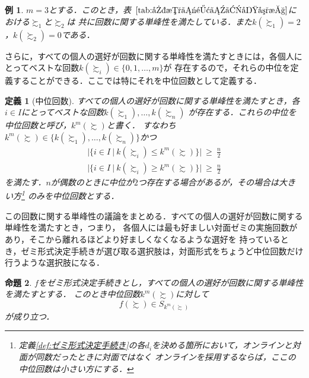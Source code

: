 \documentclass[dvipdfmx]{jsarticle}
\newtheorem{definition}{定義}
\newtheorem{proposition}[definition]{命題}
\newtheorem{example}{例}
\begin{document}
\begin{example}
  $m=3$とする．このとき，表~$\ref{tab:回数に関する単峰性}$における$\succsim_1$と$\succsim_2$は
  共に回数に関する単峰性を満たしている．また$k(\succsim_1) = 2$，$k(\succsim_2) = 0$である．
\end{example}

さらに，すべての個人の選好が回数に関する単峰性を満たすときには，各個人にとってベストな回数$k(\succsim_i) \in \{0,1,\ldots,m\}$が
存在するので，それらの中位を定義することができる．ここでは特にそれを中位回数として定義する．

\begin{definition}[中位回数]\label{def:中位回数}
  すべての個人の選好が回数に関する単峰性を満たすとき，各$i \in I$にとってベストな回数$k(\succsim_1),\ldots,k(\succsim_n)$
  が存在する．これらの中位を中位回数と呼び，$k^m(\succsim)$と書く．
  すなわち$k^m(\succsim) \in \{k(\succsim_1), \ldots, k(\succsim_n) \}$かつ
  \begin{gather*}
    |\{i \in I \ | \ k(\succsim_i) \leq k^m(\succsim) \}| \ \geq \ \frac{n}{2} \\
    |\{i \in I \ | \ k(\succsim_i) \geq k^m(\succsim) \}| \ \geq \ \frac{n}{2}
  \end{gather*}
  を満たす．$n$が偶数のときに中位が$2$つ存在する場合があるが，その場合は大きい方\footnote{
    定義\ref{def:ゼミ形式決定手続き}の各$d_i$を決める箇所において，オンラインと対面が同数だったときに対面ではなく
    オンラインを採用するならば，ここの中位回数は小さい方にする．
  }
  のみを中位回数とする．
\end{definition}

この回数に関する単峰性の議論をまとめる．すべての個人の選好が回数に関する単峰性を満たすとき，つまり，
各個人には最も好ましい対面ゼミの実施回数があり，そこから離れるほどより好ましくなくなるような選好を
持っているとき，ゼミ形式決定手続きが選び取る選択肢は，対面形式をちょうど中位回数だけ行うような選択肢になる．

\begin{proposition}
  $f$をゼミ形式決定手続きとし，すべての個人の選好が回数に関する単峰性を満たすとする．
  このとき中位回数$k^m(\succsim)$に対して
  \[
    f(\succsim) \in S_{k^m(\succsim)}
  \]
  が成り立つ．
\end{proposition}
\end{document}
